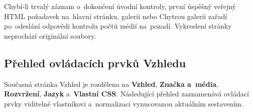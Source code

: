 \documentclass[11pt,a4paper]{article}
\newcommand{\ui}[1]{\textbf{#1}}
\begin{document}
Chybí-li trvalý záznam o~dokončení úvodní kontroly, první úspěšný veřejný HTML
požadavek na~hlavní stránku, galerii nebo Chytrou galerii zařadí po~odeslání
odpovědi kontrolu počtů médií na~pozadí. Vykreslení stránky neprochází
originální
soubory.

\subsection{Přehled ovládacích prvků Vzhledu}

Současná stránka Vzhled je rozdělena na \ui{Vzhled}, \ui{Značka a~média},
\ui{Rozvržení}, \ui{Jazyk} a~\ui{Vlastní CSS}. Následující přehled zaznamenává
ovládací prvky viditelné vlastníkovi a~normalizaci vynucovanou aktuálním
sestavením.
\end{document}
